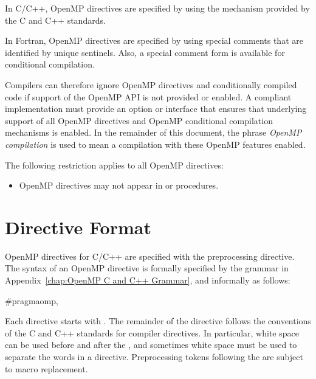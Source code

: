 \ccppspecificstart
In C/C++, OpenMP directives are specified by using the  mechanism provided 
by the C and C++ standards. 
\ccppspecificend

\fortranspecificstart
In Fortran, OpenMP directives are specified by using special comments that are 
identified by unique sentinels. Also, a special comment form is available for conditional 
compilation. 
\fortranspecificend

Compilers can therefore ignore OpenMP directives and conditionally compiled code if 
support of the OpenMP API is not provided or enabled. A compliant implementation 
must provide an option or interface that ensures that underlying support of all OpenMP 
directives and OpenMP conditional compilation mechanisms is enabled. In the 
remainder of this document, the phrase \emph{OpenMP compilation} is used to mean a 
compilation with these OpenMP features enabled.

\begin{samepage}
\fortranspecificstart
\restrictions
The following restriction applies to all OpenMP directives: 
\begin{itemize}
\item OpenMP directives may not appear in  or  procedures.
\end{itemize}
\fortranspecificend
\end{samepage}








\section{Directive Format}
\label{sec:Directive Format}
\ccppspecificstart
OpenMP directives for C/C++ are specified with the  preprocessing directive. 
The syntax of an OpenMP directive is formally specified by the grammar in 
Appendix~\ref{chap:OpenMP C and C++ Grammar}, and informally as follows:

\begin{boxedcode}
\#pragma\plc{ }omp\plc{ directive-name [clause[ [},\plc{] clause] ... ] new-line}
\end{boxedcode}

Each directive  starts with  . The remainder of the directive follows the 
conventions of the C and C++ standards for compiler directives. In particular, white 
space can be used before and after the \code{\#}, and sometimes white space must be used to 
separate the words in a directive. Preprocessing tokens following the  
are subject to macro replacement. 

